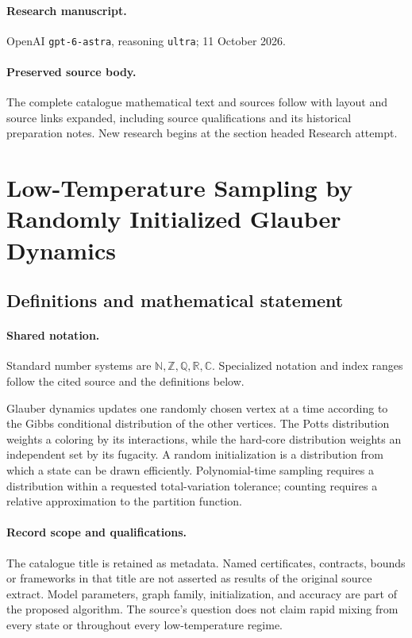 \documentclass[11pt]{article}
\begin{document}
\paragraph{Research manuscript.} OpenAI \texttt{gpt-6-astra}, reasoning \texttt{ultra}; 11 October 2026.
\paragraph{Preserved source body.} The complete catalogue mathematical text and sources follow with layout and source links expanded, including source qualifications and its historical preparation notes. New research begins at the section headed Research attempt.

\section{Low-Temperature Sampling by Randomly Initialized Glauber Dynamics}\label{statement}

\subsection{Definitions and mathematical statement}

\paragraph{Shared notation.}Standard number systems are $\mathbb N,\mathbb Z,\mathbb Q,\mathbb R,\mathbb C$. Specialized notation and index ranges follow the cited source and the definitions below.


Glauber dynamics updates one randomly chosen vertex at a time according to the Gibbs conditional distribution of the other vertices. The Potts distribution weights a coloring by its interactions, while the hard-core distribution weights an independent set by its fugacity. A random initialization is a distribution from which a state can be drawn efficiently. Polynomial-time sampling requires a distribution within a requested total-variation tolerance; counting requires a relative approximation to the partition function.
\paragraph{Record scope and qualifications.}
The catalogue title is retained as metadata. Named certificates, contracts, bounds or frameworks in that title are not asserted as results of the original source extract.
Model parameters, graph family, initialization, and accuracy are part of the proposed algorithm. The source's question does not claim rapid mixing from every state or throughout every low-temperature regime.
\end{document}

